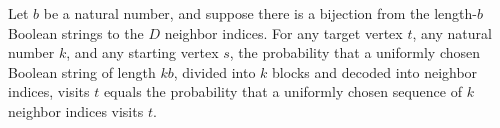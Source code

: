 \begin{theorem}
\label{Randomized.RegularMultigraph.randProb_hits_decodeIdx}
\leanok
{}
Let $b$ be a natural number, and suppose there is a bijection from the length-$b$
Boolean strings to the $D$ neighbor indices. For any target vertex $t$, any natural
number $k$, and any starting vertex $s$, the probability that a uniformly chosen Boolean
string of length $kb$, divided into $k$ blocks and decoded into neighbor indices, visits
$t$ equals the probability that a uniformly chosen sequence of $k$ neighbor indices
visits $t$.
\end{theorem}
